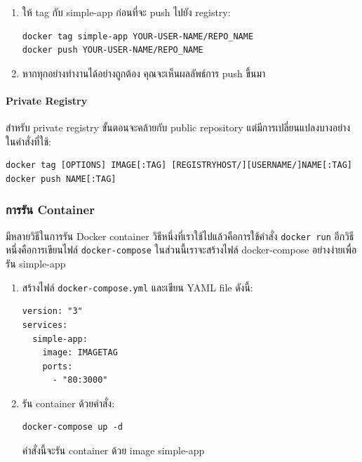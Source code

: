 \begin{enumerate}
      \item ให้ tag กับ simple-app ก่อนที่จะ push ไปยัง registry:
            \begin{verbatim}
docker tag simple-app YOUR-USER-NAME/REPO_NAME
docker push YOUR-USER-NAME/REPO_NAME
    \end{verbatim}
      \item หากทุกอย่างทำงานได้อย่างถูกต้อง คุณจะเห็นผลลัพธ์การ push ขึ้นมา
\end{enumerate}

\paragraph{Private Registry}
สำหรับ private registry ขั้นตอนจะคล้ายกับ public repository แต่มีการเปลี่ยนแปลงบางอย่างในคำสั่งที่ใช้:

\begin{verbatim}
docker tag [OPTIONS] IMAGE[:TAG] [REGISTRYHOST/][USERNAME/]NAME[:TAG]
docker push NAME[:TAG]
\end{verbatim}

\clearpage
\subsubsection{การรัน Container}

มีหลายวิธีในการรัน Docker container วิธีหนึ่งที่เราใช้ไปแล้วคือการใช้คำสั่ง \texttt{docker run} อีกวิธีหนึ่งคือการเขียนไฟล์ \texttt{docker-compose} ในส่วนนี้เราจะสร้างไฟล์ docker-compose อย่างง่ายเพื่อรัน simple-app

\begin{enumerate}
      \item สร้างไฟล์ \texttt{docker-compose.yml} และเขียน YAML file ดังนี้:
            \begin{verbatim}
version: "3"
services:
  simple-app:
    image: IMAGETAG
    ports:
      - "80:3000"
    \end{verbatim}

      \item รัน container ด้วยคำสั่ง:
            \begin{verbatim}
docker-compose up -d
    \end{verbatim}
            คำสั่งนี้จะรัน container ด้วย image simple-app
\end{enumerate}